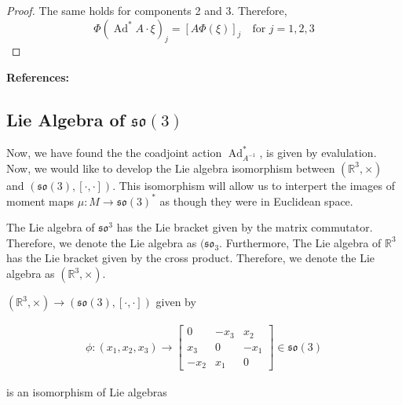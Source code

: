 \begin{proof}
\noindent The same holds for components 2 and 3. Therefore,
\[
\Phi \left( \operatorname{Ad}^* A \cdot \xi \right )_j = \left[ A \Phi(\xi) \right] _j
\quad \text{for } j = 1, 2, 3
\]

\noindent 
\end{proof}

\noindent \textbf{References: } \textcite{Blaom1996}

\subsection{Lie Algebra of $\mathfrak{so}(3)$}

Now, we have found the the coadjoint action $\operatorname{Ad}_{A^{-1}}^{*}$, is given by evalulation. Now, we would like to develop the Lie algebra isomorphism between $(\mathbb{R}^{3}, \times)$ and $(\mathfrak{so}(3), [\cdot, \cdot])$. This isomorphism will allow us to interpert the images of moment maps $\mu: M \to \mathfrak{so}(3)^{*}$ as though they were in Euclidean space. 

\begin{remark}
The Lie algebra of $\mathfrak{so}^{3}$ has the Lie bracket given by the matrix commutator. Therefore, we denote the Lie algebra as $(\mathfrak{so}_{3}$.  Furthermore,  The Lie algebra of $\mathbb{R}^{3}$ has the Lie bracket given by the cross product. Therefore, we denote the Lie algebra as $(\mathbb{R}^{3}, \times)$. 
\end{remark}

\begin{lemma}
\label{LieAlgebraIso}
$(\mathbb{R}^{3}, \times) \to (\mathfrak{so}(3), [\cdot, \cdot])$ given by 

\begin{align}
\phi: (x_1, x_{2}, x_{3}) \to 
\begin{bmatrix}
0 & -x_3 & x_2 \\
x_3 & 0 & -x_1 \\
-x_2 & x_1 & 0
\end{bmatrix}
\in \mathfrak{so}(3) 
\end{align}

\noindent is an isomorphism of Lie algebras
\end{lemma}

